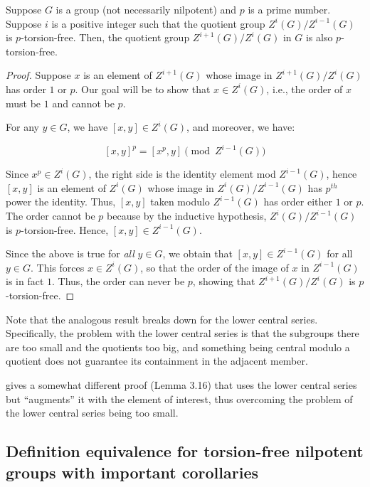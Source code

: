 \documentclass{ucetd}
\begin{document}
\begin{lemma}\label{ucs-torsion-free}
  Suppose $G$ is a group (not necessarily nilpotent) and $p$ is a
  prime number. Suppose $i$ is a positive integer such that the
  quotient group $Z^i(G)/Z^{i-1}(G)$ is $p$-torsion-free. Then, the
  quotient group $Z^{i+1}(G)/Z^i(G)$ in $G$ is also $p$-torsion-free.
\end{lemma}

\begin{proof}
  Suppose $x$ is an element of $Z^{i+1}(G)$ whose image in
  $Z^{i+1}(G)/Z^i(G)$ has order $1$ or $p$. Our goal will be to show
  that $x \in Z^i(G)$, i.e., the order of $x$ must be $1$ and cannot
  be $p$.

  For any $y \in G$, we have $[x,y] \in Z^i(G)$, and moreover, we
  have:

  $$[x,y]^p = [x^p,y] \pmod{Z^{i-1}(G)}$$

  Since $x^p \in Z^i(G)$, the right side is the identity element mod
  $Z^{i-1}(G)$, hence $[x,y]$ is an element of $Z^i(G)$ whose image in
  $Z^i(G)/Z^{i-1}(G)$ has $p^{th}$ power the identity. Thus, $[x,y]$
  taken modulo $Z^{i-1}(G)$ has order either $1$ or $p$. The order
  cannot be $p$ because by the inductive hypothesis,
  $Z^i(G)/Z^{i-1}(G)$ is $p$-torsion-free. Hence, $[x,y] \in Z^{i-1}(G)$.

  Since the above is true for {\em all} $y \in G$, we obtain that
  $[x,y] \in Z^{i-1}(G)$ for all $y \in G$. This forces $x \in
  Z^i(G)$, so that the order of the image of $x$ in $Z^{i-1}(G)$ is in
  fact $1$. Thus, the order can never be $p$, showing that
  $Z^{i+1}(G)/Z^i(G)$ is $p$-torsion-free.
\end{proof}

Note that the analogous result breaks down for the lower central
series. Specifically, the problem with the lower central series is
that the subgroups there are too small and the quotients too big, and
something being central modulo a quotient does not guarantee its
containment in the adjacent member.

\cite{Khukhro} gives a somewhat different proof (Lemma 3.16) that uses
the lower central series but ``augments'' it with the element of
interest, thus overcoming the problem of the lower central series being too small.

\subsection{Definition equivalence for torsion-free nilpotent groups with important corollaries}
\end{document}
